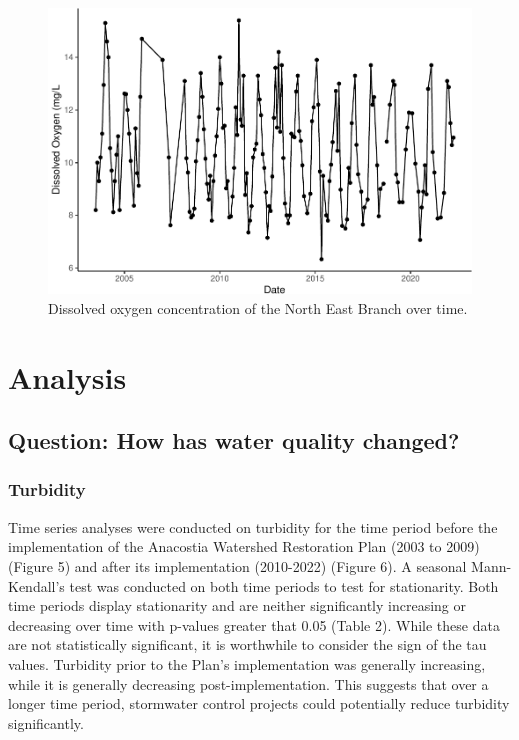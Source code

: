 \documentclass[
  12pt,
]{article}
\begin{document}
\begin{figure}

\includegraphics{Fischer_WDA_FinalProject_files/figure-latex/Dissolved oxygen over time-1} \hfill{}

\caption{Dissolved oxygen concentration of the North East Branch over time.}\label{fig:Dissolved oxygen over time}
\end{figure}

\newpage

\hypertarget{analysis}{%
\section{Analysis}\label{analysis}}

\hypertarget{question-how-has-water-quality-changed}{%
\subsection{Question: How has water quality
changed?}\label{question-how-has-water-quality-changed}}

\hypertarget{turbidity}{%
\subsubsection{Turbidity}\label{turbidity}}

Time series analyses were conducted on turbidity for the time period
before the implementation of the Anacostia Watershed Restoration Plan
(2003 to 2009) (Figure 5) and after its implementation (2010-2022)
(Figure 6). A seasonal Mann-Kendall's test was conducted on both time
periods to test for stationarity. Both time periods display stationarity
and are neither significantly increasing or decreasing over time with
p-values greater that 0.05 (Table 2). While these data are not
statistically significant, it is worthwhile to consider the sign of the
tau values. Turbidity prior to the Plan's implementation was generally
increasing, while it is generally decreasing post-implementation. This
suggests that over a longer time period, stormwater control projects
could potentially reduce turbidity significantly.
\end{document}
